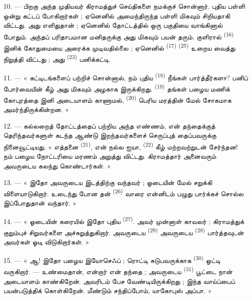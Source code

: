 \VUsaut{3.0mm}
\VUsaut{3.0mm}

10. --- பிறகு அந்த முதியவர் கிராமத்துச் செய்திகளை நமக்குச் சொன்னார்.
புதிய பள்ளி ஒன்று கட்டப் போகிறார்கள் ; ஏனெனில்  அமைந்திருந்த பள்ளி மிகவும் சிறியதாகி விட்டது. அது எளிதுதான் ;
ஏனெனில்  தோட்டத்தில் ஒரு பகுதியை
வாங்கினால் போதும். அந்தப் பரிதாபமான மனிதருக்கு அது மிகவும் பயன் தரும்.
குளிரால்  \textsuperscript{(16)}  இனிக் கோதுமையை அரைக்க முடிவதில்லை ; ஏனெனில்
 \textsuperscript{(17)} 
\textsuperscript{(25)} உறைய வைத்து நிறுத்தி விட்டது ; அது
 \textsuperscript{(23)} பனிக்கட்டி.

11. --- « கட்டிடங்களைப் பற்றிச் சொன்னால், நம் புதிய 
\textsuperscript{(18)} நீங்கள் பார்த்தீர்களா? பனிப் போர்வையின் கீழ் அது
மிகவும் அழகாக இருக்கிறது.  \textsuperscript{(19)} தங்கள்
பழைய மணிக் கோபுரத்தை இனி அடையாளம் காணாமல்,  \textsuperscript{(20)} பெரிய மரத்தின் மேல் சோகமாக
அமர்ந்திருக்கின்றன. »

12. --- கல்லறைத் தோட்டத்தைப் பற்றிய அந்த எண்ணம், என் தந்தைக்குத்
தெரிந்தவர்களுள் கடந்த ஆண்டு இறந்தவர்களைச் செருப்புத் தைப்பவருக்கு
நினைவூட்டியது. « எத்தனை  \textsuperscript{(21)}, என்
நல்ல ஐயா,  \textsuperscript{(22)} கீழ்
மற்றவற்றுடன் சேர்ந்தன! நம் பழைய நோட்டரியை மரணம் அறுத்து விட்டது.
கிராமத்தார் அனைவரும் அவருடைய  கலந்து
கொண்டார்கள். »

13. --- « இதோ அவருடைய இடத்திற்கு வந்தவர் ; ஓடையின் மேல் சறுக்கி
விளையாடுகிறார். உடைந்து போன தன் 
\textsuperscript{(26)} வாரை என்னிடம் பழுது பார்க்கச் சொல்ல இப்போதுதான்
வந்தார். »

14. --- « ஓடையின் கரையில் இதோ புதிய 
\textsuperscript{(27)}. அவர் முன்னாள் காவலர் ; கிராமத்துக் குறும்புச்
சிறுவர்களை அச்சுறுத்துகிறார். அவருடைய 
\textsuperscript{(29)} அவருடைய 
\textsuperscript{(28)} பார்த்தவுடன் அவர்கள் ஓடி விடுகிறார்கள். »

15. --- « ஆ! இதோ பழைய இயோசெஃப் ; ரொட்டி சுடுபவருக்காக  \textsuperscript{(30)} ஓட்டி வருகிறார்.
--- உண்மைதான், என்றார் என் தந்தை ; அவருடைய 
\textsuperscript{(31)} பூட்டை நான் அடையாளம் காண்கிறேன். அவரிடம் பேச
வேண்டியிருக்கிறது ; இந்த வாய்ப்பைப் பயன்படுத்திக் கொள்கிறேன்.
மீண்டும் சந்திப்போம், யாகோபுஸ் அப்பா. »

